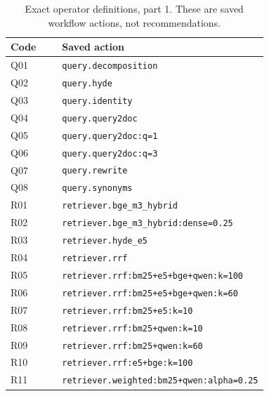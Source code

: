 \begin{table}[p]
\centering
\small
\setlength{\tabcolsep}{4pt}
\caption{Exact operator definitions, part 1. These are saved workflow actions, not recommendations.}
\label{tab:rag-operator-dictionary-1}
\begin{tabular}{@{}lp{0.80\linewidth}@{}}
\toprule
Code & Saved action \\
\midrule
Q01 & \texttt{query.\allowbreak{}decomposition} \\
Q02 & \texttt{query.\allowbreak{}hyde} \\
Q03 & \texttt{query.\allowbreak{}identity} \\
Q04 & \texttt{query.\allowbreak{}query2doc} \\
Q05 & \texttt{query.\allowbreak{}query2doc:\allowbreak{}q=\allowbreak{}1} \\
Q06 & \texttt{query.\allowbreak{}query2doc:\allowbreak{}q=\allowbreak{}3} \\
Q07 & \texttt{query.\allowbreak{}rewrite} \\
Q08 & \texttt{query.\allowbreak{}synonyms} \\
R01 & \texttt{retriever.\allowbreak{}bge\_m3\_hybrid} \\
R02 & \texttt{retriever.\allowbreak{}bge\_m3\_hybrid:\allowbreak{}dense=\allowbreak{}0.\allowbreak{}25} \\
R03 & \texttt{retriever.\allowbreak{}hyde\_e5} \\
R04 & \texttt{retriever.\allowbreak{}rrf} \\
R05 & \texttt{retriever.\allowbreak{}rrf:\allowbreak{}bm25+\allowbreak{}e5+\allowbreak{}bge+\allowbreak{}qwen:\allowbreak{}k=\allowbreak{}100} \\
R06 & \texttt{retriever.\allowbreak{}rrf:\allowbreak{}bm25+\allowbreak{}e5+\allowbreak{}bge+\allowbreak{}qwen:\allowbreak{}k=\allowbreak{}60} \\
R07 & \texttt{retriever.\allowbreak{}rrf:\allowbreak{}bm25+\allowbreak{}e5:\allowbreak{}k=\allowbreak{}10} \\
R08 & \texttt{retriever.\allowbreak{}rrf:\allowbreak{}bm25+\allowbreak{}qwen:\allowbreak{}k=\allowbreak{}10} \\
R09 & \texttt{retriever.\allowbreak{}rrf:\allowbreak{}bm25+\allowbreak{}qwen:\allowbreak{}k=\allowbreak{}60} \\
R10 & \texttt{retriever.\allowbreak{}rrf:\allowbreak{}e5+\allowbreak{}bge:\allowbreak{}k=\allowbreak{}100} \\
R11 & \texttt{retriever.\allowbreak{}weighted:\allowbreak{}bm25+\allowbreak{}qwen:\allowbreak{}alpha=\allowbreak{}0.\allowbreak{}25} \\

\end{tabular}
\end{table}
